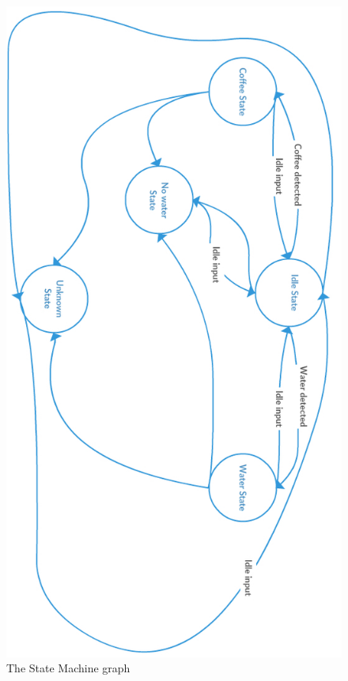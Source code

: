 \documentclass[12pt]{article}
\begin{document}
   \begin{figure}[H]
   \centering
   \includegraphics[height=1.0\textheight]{./images/stateMachine}
   \captionsetup{justification=centering}
   \caption{The State Machine graph}
   \label{fig:stateMachine}
  \end{figure}
  
\end{document}
